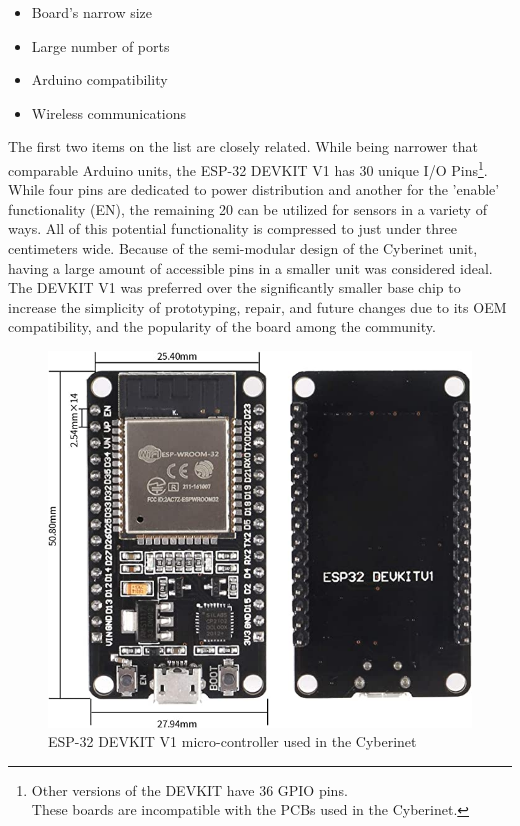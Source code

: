 \begin{itemize}
    \item Board's narrow size
    \item Large number of ports
    \item Arduino compatibility
    \item Wireless communications
\end{itemize}

The first two items on the list are closely related. While being narrower that comparable Arduino units, the ESP-32 DEVKIT V1 has 30 unique I/O Pins\footnote{Other versions of the DEVKIT have 36 GPIO pins. \\These boards are incompatible with the PCBs used in the Cyberinet.}. While four pins are dedicated to power distribution and another for the 'enable' functionality (EN), the remaining 20 can be utilized for sensors in a variety of ways. All of this potential functionality is compressed to just under three centimeters wide. Because of the semi-modular design of the Cyberinet unit, having a large amount of accessible pins in a smaller unit was considered ideal. The DEVKIT V1 was preferred over the significantly smaller base chip to increase the simplicity of prototyping, repair, and future changes due to its OEM compatibility, and the popularity of the board among the community.

\begin{center}
    \begin{figure}
        \centering
        \includegraphics[scale=0.5]{diagrams/oem/esp-32.jpg}
        \caption{ESP-32 DEVKIT V1 micro-controller used in the Cyberinet}
        \label{fig:esp-32}
    \end{figure}
\end{center}

